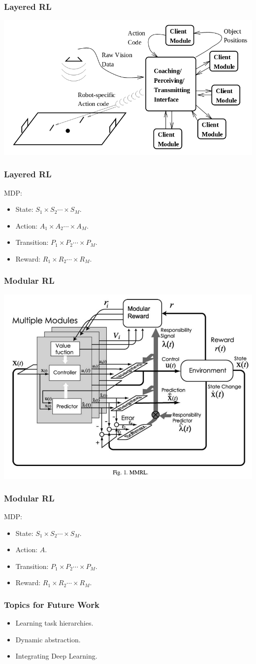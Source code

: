 \documentclass{beamer}
\begin{document}
\begin{frame}
\frametitle{Layered RL}
\includegraphics[width=0.8\columnwidth]{layer.png}
\end{frame}

\begin{frame}
\frametitle{Layered RL}
MDP:
\begin{itemize}
  \item State: {\color{red}$S_1 \times S_2 \cdots \times S_M $}.
  \item Action: {\color{red}$A_1 \times A_2 \cdots \times A_M $}.
  \item Transition: {\color{red}$P_1 \times P_2 \cdots \times P_M $}.
  \item Reward: {\color{red}$R_1 \times R_2 \cdots \times R_M $}.
\end{itemize}
\end{frame}

\begin{frame}
\frametitle{Modular RL}
\includegraphics[width=0.8\columnwidth]{mrl.png}
\end{frame}

\begin{frame}
\frametitle{Modular RL}
MDP:
\begin{itemize}
  \item State: {\color{red}$S_1 \times S_2 \cdots \times S_M $}.
  \item Action: $A$.
  \item Transition: {\color{red}$P_1 \times P_2 \cdots \times P_M $}.
  \item Reward: {\color{red}$R_1 \times R_2 \cdots \times R_M $}.
\end{itemize}
\end{frame}

\begin{frame}
\frametitle{Topics for Future Work}
\begin{itemize}
  \item Learning task hierarchies.
  \item Dynamic abstraction. 
  \item Integrating Deep Learning. 
\end{itemize}
\end{frame}
\end{document}
